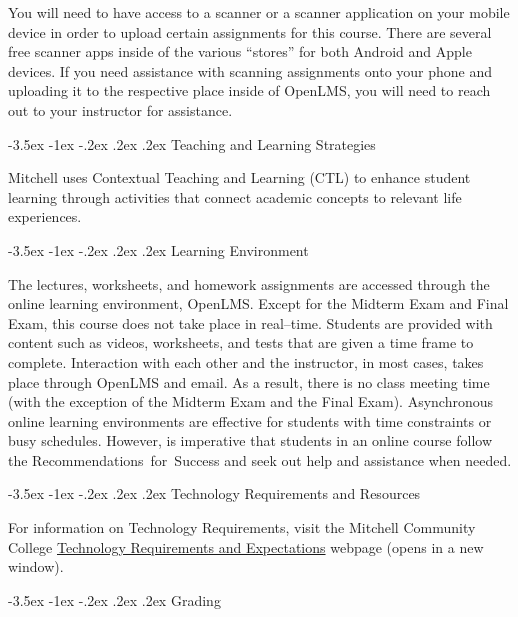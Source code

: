 \documentclass[11pt]{article}
\makeatletter
\renewcommand\section{\@startsection{section}{1}{0pt}%
  {-3.5ex \@plus -1ex \@minus -.2ex}%
  {.2ex \@plus.2ex}%
  {\normalfont\Large\bfseries}} %
\makeatother
\begin{document}
You will need to have access to a scanner or a scanner application on your mobile device in order to upload certain assignments for this course. There are several free scanner apps inside of the various ``stores'' for both Android and Apple devices. If you need assistance with scanning assignments onto your phone and uploading it to the respective place inside of OpenLMS, you will need to reach out to your instructor for assistance.

\section{Teaching and Learning Strategies}

Mitchell uses Contextual Teaching and Learning (CTL) to enhance student learning through activities that connect academic concepts to relevant life experiences.

\section{Learning Environment}

The lectures, worksheets, and homework assignments are accessed through the online learning environment, OpenLMS. Except for the Midterm Exam and Final Exam, this course does not take place in real--time. Students are provided with content such as videos, worksheets, and tests that are given a time frame to complete. Interaction with each other and the instructor, in most cases, takes place through OpenLMS and email. As a result, there is no class meeting time (with the exception of the Midterm Exam and the Final Exam). Asynchronous online learning environments are effective for students with time constraints or busy schedules. However, is imperative that students in an online course follow the Recommendations~for~Success and seek out help and assistance when needed.

\section{Technology Requirements and Resources}

For information on Technology Requirements, visit the Mitchell Community College \href{https://www.mitchellcc.edu/college-credit-online-classes/\#online-learning}{Technology Requirements and Expectations} webpage (opens in a new window).

\section{Grading}
\end{document}
